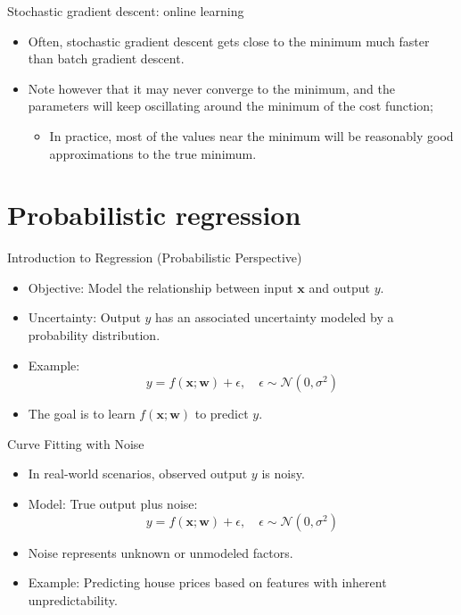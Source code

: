\documentclass[serif, aspectratio=169]{beamer}
\begin{document}
\begin{frame}{Stochastic gradient descent: online learning}

\begin{itemize}
    \item Often, stochastic gradient descent gets close to the minimum much faster than batch gradient descent.
    \item Note however that it may never converge to the minimum, and the parameters will keep oscillating around the minimum of the cost function;
    \begin{itemize}
        \item In practice, most of the values near the minimum will be reasonably good approximations to the true minimum.
    \end{itemize}
\end{itemize}

\end{frame}

\section{Probabilistic regression}
\begin{frame}{Introduction to Regression (Probabilistic Perspective)}
    \begin{itemize}
        \item Objective: Model the relationship between input \( \mathbf{x} \) and output \( y \).
        \item Uncertainty: Output \( y \) has an associated uncertainty modeled by a probability distribution.
        \item Example:
        \[
        y = f(\mathbf{x}; \mathbf{w}) + \epsilon, \quad \epsilon \sim \mathcal{N}(0, \sigma^2)
        \]
        \item The goal is to learn \( f(\mathbf{x}; \mathbf{w}) \) to predict \( y \).
    \end{itemize}
\end{frame}

\begin{frame}{Curve Fitting with Noise}
    \begin{itemize}
        \item In real-world scenarios, observed output \( y \) is noisy.
        \item Model: True output plus noise:
        \[
        y = f(\mathbf{x}; \mathbf{w}) + \epsilon, \quad \epsilon \sim \mathcal{N}(0, \sigma^2)
        \]
        \item Noise represents unknown or unmodeled factors.
        \item Example: Predicting house prices based on features with inherent unpredictability.
    \end{itemize}
\end{frame}
\end{document}
